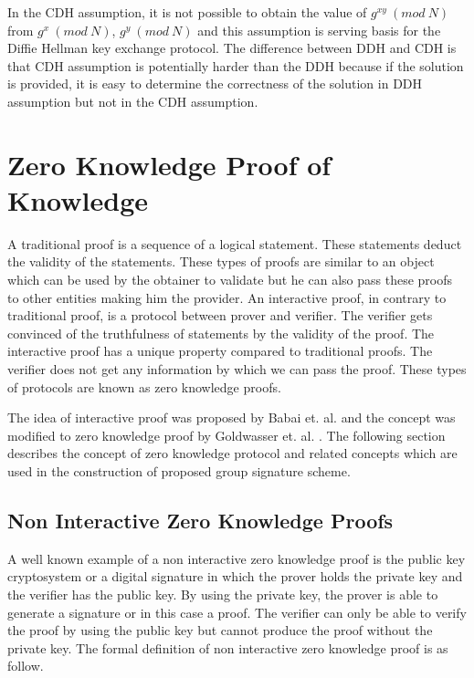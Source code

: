 In the CDH assumption, it is not possible to obtain the value of $g^{xy}~(mod~N)$ from $g^x ~(mod~N)$, $g^y ~(mod~N)$ and this assumption is serving basis for the Diffie Hellman key exchange protocol.
The difference between DDH and CDH is that CDH assumption is potentially harder than the DDH because if the solution is provided, it is easy to determine the correctness of the solution in DDH assumption but not in the CDH assumption.

\section{Zero Knowledge Proof of Knowledge}
A traditional proof is a sequence of a logical statement. These statements deduct the validity of the statements. These types of proofs are similar to an object which can be used by the obtainer to validate but he can also pass these proofs to other entities making him the provider. An interactive proof, in contrary to traditional proof, is a protocol between prover and verifier. The verifier gets convinced of the truthfulness of statements by the validity of the proof. The interactive proof has a unique property compared to traditional proofs. The verifier does not get any information by which we can pass the proof. These types of protocols are known as zero knowledge proofs. 

The idea of interactive proof was proposed by Babai et. al. \cite{babai1985trading, babai1988arthur} and the concept was modified to zero knowledge proof by Goldwasser et. al. \cite{goldwasser1989knowledge}. The following section describes the concept of zero knowledge protocol and related concepts which are used in the construction of proposed group signature scheme.

\subsection{Non Interactive Zero Knowledge Proofs}
A well known example of a non interactive zero knowledge proof is the public key cryptosystem or a digital signature in which the prover holds the private key and the verifier has the public key. By using the private key, the prover is able to generate a signature or in this case a proof. The verifier can only be able to verify the proof by using the public key but cannot produce the proof without the private key. The formal definition of non interactive zero knowledge proof is as follow.

